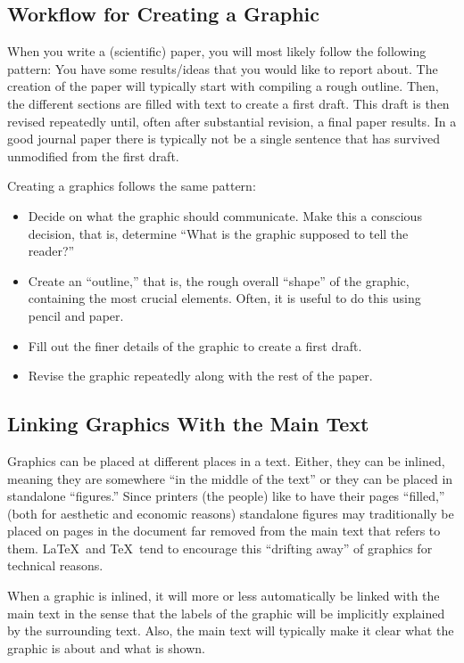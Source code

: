 \subsection{Workflow for Creating a Graphic}

When you write a (scientific) paper, you will most likely follow the
following pattern: You have some results/ideas that you would
like to report about. The creation of the paper will typically start
with compiling a rough outline. Then, the different sections are
filled with text to create a first draft. This draft is then revised
repeatedly until, often after substantial revision, a final paper
results. In a good journal paper there is typically not be a single 
sentence that has survived unmodified from the first draft.

Creating a graphics follows the same pattern:
\begin{itemize}
\item
  Decide on what the graphic should communicate. Make this a conscious
  decision, that is, determine ``What is the graphic supposed to tell
  the reader?''
\item
  Create an ``outline,'' that is, the rough overall ``shape'' of the
  graphic, containing the most crucial elements. Often, it is
  useful to do this using pencil and paper.
\item
  Fill out the finer details of the graphic to create a first
  draft.
\item
  Revise the graphic repeatedly along with the rest of the paper.
\end{itemize}




\subsection{Linking Graphics With the Main Text}

Graphics can be placed at different places in a text. Either, they can
be inlined, meaning they are somewhere ``in the middle of the text''
or they can be placed in standalone ``figures.'' Since printers (the
people) like to have their pages ``filled,'' (both for aesthetic and
economic reasons) standalone figures may traditionally be placed on
pages in the document far removed from the main text that refers to
them. \LaTeX\ and \TeX\ tend to encourage this ``drifting away'' of
graphics for technical reasons. 

When a graphic is inlined, it will more or less automatically be
linked with the main text in the sense that the labels of the graphic
will be implicitly explained by the surrounding text. Also, the main
text will typically make it clear what the graphic is about and what
is shown.

